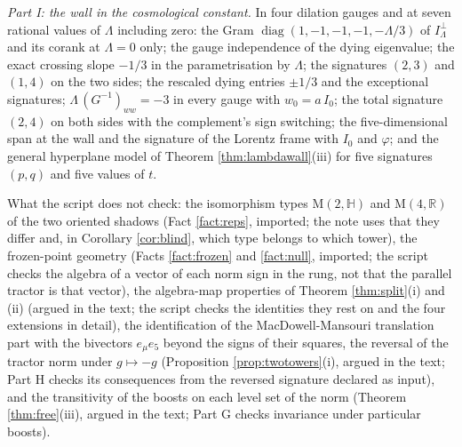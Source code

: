 \documentclass[11pt]{article}
\theoremstyle{definition}
\newcommand{\R}{\mathbb{R}}
\newcommand{\HH}{\mathbb{H}}
\newcommand{\Mat}{\mathrm{M}}
\begin{document}
\emph{Part I: the wall in the cosmological constant.} In four dilation gauges and at seven rational values of $\Lambda$ including zero: the Gram $\operatorname{diag}(1,-1,-1,-1,-\Lambda/3)$ of $I_{\Lambda}^{\perp}$ and its corank at $\Lambda = 0$ only; the gauge independence of the dying eigenvalue; the exact crossing slope $-1/3$ in the parametrisation by $\Lambda$; the signatures $(2,3)$ and $(1,4)$ on the two sides; the rescaled dying entries $\pm 1/3$ and the exceptional signatures; $\Lambda\,(G^{-1})_{ww} = -3$ in every gauge with $w_{0} = a\,I_{0}$; the total signature $(2,4)$ on both sides with the complement's sign switching; the five-dimensional span at the wall and the signature of the Lorentz frame with $I_{0}$ and $\varphi$; and the general hyperplane model of Theorem \ref{thm:lambdawall}(iii) for five signatures $(p,q)$ and five values of $t$.

What the script does not check: the isomorphism types $\Mat(2,\HH)$ and $\Mat(4,\R)$ of the two oriented shadows (Fact \ref{fact:reps}, imported; the note uses that they differ and, in Corollary \ref{cor:blind}, which type belongs to which tower), the frozen-point geometry (Facts \ref{fact:frozen} and \ref{fact:null}, imported; the script checks the algebra of a vector of each norm sign in the rung, not that the parallel tractor is that vector), the algebra-map properties of Theorem \ref{thm:split}(i) and (ii) (argued in the text; the script checks the identities they rest on and the four extensions in detail), the identification of the MacDowell-Mansouri translation part with the bivectors $e_{\mu}e_{5}$ beyond the signs of their squares, the reversal of the tractor norm under $g \mapsto -g$ (Proposition \ref{prop:twotowers}(i), argued in the text; Part H checks its consequences from the reversed signature declared as input), and the transitivity of the boosts on each level set of the norm (Theorem \ref{thm:free}(iii), argued in the text; Part G checks invariance under particular boosts).
\end{document}

